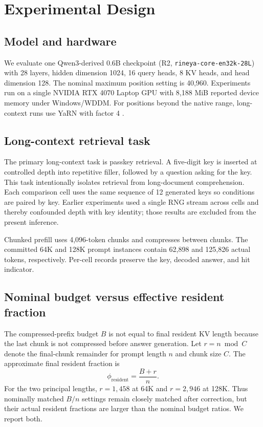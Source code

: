 \documentclass[10pt,twocolumn]{article}
\begin{document}
\section{Experimental Design}
\subsection{Model and hardware}
We evaluate one Qwen3-derived 0.6B checkpoint (R2, \texttt{rineya-core-en32k-28L}) with 28 layers, hidden dimension 1024, 16 query heads, 8 KV heads, and head dimension 128. The nominal maximum position setting is 40,960. Experiments run on a single NVIDIA RTX 4070 Laptop GPU with 8,188 MiB reported device memory under Windows/WDDM. For positions beyond the native range, long-context runs use YaRN with factor 4 \citep{peng2023yarn}.

\subsection{Long-context retrieval task}
The primary long-context task is passkey retrieval. A five-digit key is inserted at controlled depth into repetitive filler, followed by a question asking for the key. This task intentionally isolates retrieval from long-document comprehension. Each comparison cell uses the same sequence of 12 generated keys so conditions are paired by key. Earlier experiments used a single RNG stream across cells and thereby confounded depth with key identity; those results are excluded from the present inference.

Chunked prefill uses 4,096-token chunks and compresses between chunks. The committed 64K and 128K prompt instances contain 62,898 and 125,826 actual tokens, respectively. Per-cell records preserve the key, decoded answer, and hit indicator.

\subsection{Nominal budget versus effective resident fraction}
The compressed-prefix budget $B$ is not equal to final resident KV length because the last chunk is not compressed before answer generation. Let $r=n\bmod C$ denote the final-chunk remainder for prompt length $n$ and chunk size $C$. The approximate final resident fraction is
\begin{equation}
\phi_{\mathrm{resident}}=\frac{B+r}{n}.
\end{equation}
For the two principal lengths, $r=1,458$ at 64K and $r=2,946$ at 128K. Thus nominally matched $B/n$ settings remain closely matched after correction, but their actual resident fractions are larger than the nominal budget ratios. We report both.
\end{document}
